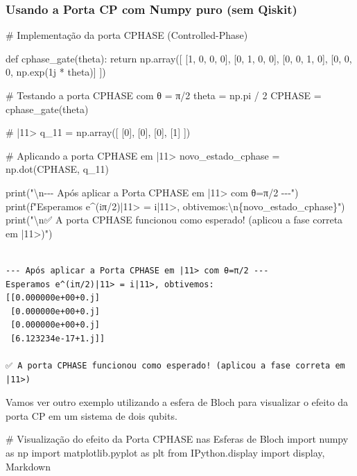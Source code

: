 \documentclass[
  brazilian,
]{report}
\newenvironment{Shaded}{\begin{snugshade}}{\end{snugshade}}
\newcommand{\NormalTok}[1]{\textcolor[rgb]{0.00,0.23,0.31}{#1}}
\begin{document}
\subsubsection{Usando a Porta CP com Numpy puro (sem
Qiskit)}\label{usando-a-porta-cp-com-numpy-puro-sem-qiskit}

\begin{Shaded}
\begin{Highlighting}[]

\NormalTok{\# Implementação da porta CPHASE (Controlled{-}Phase)}

\NormalTok{def cphase\_gate(theta):}
\NormalTok{    return np.array([}
\NormalTok{        [1, 0, 0, 0],}
\NormalTok{        [0, 1, 0, 0],}
\NormalTok{        [0, 0, 1, 0],}
\NormalTok{        [0, 0, 0, np.exp(1j * theta)]}
\NormalTok{    ])}
    
\NormalTok{\# Testando a porta CPHASE com θ = π/2}
\NormalTok{theta = np.pi / 2}
\NormalTok{CPHASE = cphase\_gate(theta)}

\NormalTok{\# |11\textgreater{}}
\NormalTok{q\_11 = np.array([}
\NormalTok{    [0],}
\NormalTok{    [0],}
\NormalTok{    [0],}
\NormalTok{    [1]}
\NormalTok{])}

\NormalTok{\# Aplicando a porta CPHASE em |11\textgreater{}}
\NormalTok{novo\_estado\_cphase = np.dot(CPHASE, q\_11)}

\NormalTok{print("\textbackslash{}n{-}{-}{-} Após aplicar a Porta CPHASE em |11\textgreater{} com θ=π/2 {-}{-}{-}")}
\NormalTok{print(f"Esperamos e\^{}(iπ/2)|11\textgreater{} = i|11\textgreater{}, obtivemos:\textbackslash{}n\{novo\_estado\_cphase\}")}
\NormalTok{print("\textbackslash{}n✅ A porta CPHASE funcionou como esperado! (aplicou a fase correta em |11\textgreater{})")}
\end{Highlighting}
\end{Shaded}

\begin{verbatim}

--- Após aplicar a Porta CPHASE em |11> com θ=π/2 ---
Esperamos e^(iπ/2)|11> = i|11>, obtivemos:
[[0.000000e+00+0.j]
 [0.000000e+00+0.j]
 [0.000000e+00+0.j]
 [6.123234e-17+1.j]]

✅ A porta CPHASE funcionou como esperado! (aplicou a fase correta em |11>)
\end{verbatim}

Vamos ver outro exemplo utilizando a esfera de Bloch para visualizar o
efeito da porta CP em um sistema de dois qubits.

\begin{Shaded}
\begin{Highlighting}[]
\NormalTok{\# Visualização do efeito da Porta CPHASE nas Esferas de Bloch}
\NormalTok{import numpy as np}
\NormalTok{import matplotlib.pyplot as plt}
\NormalTok{from IPython.display import display, Markdown}
\end{Highlighting}
\end{Shaded}
\end{document}
